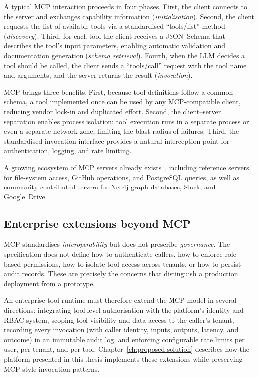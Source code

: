 \documentclass[a4paper]{sapthesis}
\begin{document}
A typical MCP interaction proceeds in four phases.  First, the client
connects to the server and exchanges capability information
(\emph{initialisation}).  Second, the client requests the list of
available tools via a standardised ``tools/list'' method
(\emph{discovery}).  Third, for each tool the client receives a JSON~Schema
that describes the tool's input parameters, enabling automatic validation
and documentation generation (\emph{schema retrieval}).  Fourth, when the
LLM decides a tool should be called, the client sends a ``tools/call''
request with the tool name and arguments, and the server returns the
result (\emph{invocation}).

MCP brings three benefits.  First, because tool definitions follow a common
schema, a tool implemented once can be used by any MCP-compatible client,
reducing vendor lock-in and duplicated effort.  Second, the
client--server separation enables process isolation: tool execution runs in
a separate process or even a separate network zone, limiting the blast
radius of failures.  Third, the standardised invocation interface provides
a natural interception point for authentication, logging, and rate
limiting.

A growing ecosystem of MCP servers already
exists~\cite{mcpservers2024}, including reference servers for file-system
access, GitHub operations, and PostgreSQL queries, as well as
community-contributed servers for Neo4j graph databases, Slack, and
Google~Drive.

\subsection{Enterprise extensions beyond MCP}

MCP standardises \emph{interoperability} but does not prescribe
\emph{governance}.  The specification does not define how to authenticate
callers, how to enforce role-based permissions, how to isolate tool access
across tenants, or how to persist audit records.  These are precisely the
concerns that distinguish a production deployment from a prototype.

An enterprise tool runtime must therefore extend the MCP model in several
directions: integrating tool-level authorisation with the platform's
identity and RBAC system, scoping tool visibility and data access to the
caller's tenant, recording every invocation (with caller identity, inputs,
outputs, latency, and outcome) in an immutable audit log, and enforcing
configurable rate limits per user, per tenant, and per tool.
Chapter~\ref{ch:proposed-solution} describes how the platform presented in
this thesis implements these extensions while preserving MCP-style
invocation patterns.
\end{document}
